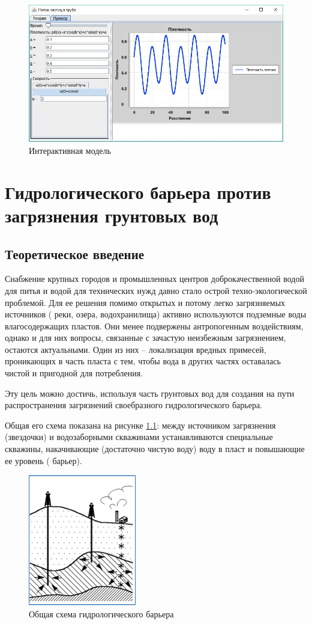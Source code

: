 		\begin{figure}[th]
			\centering
			\includegraphics[width=0.7\linewidth]{images/tube_example}
			\caption{Интерактивная модель}
			\label{fig:tubeexample}
		\end{figure}
	

\chapter{Гидрологического барьера против загрязнения грунтовых вод}

	\section{Теоретическое введение}
		Снабжение крупных городов и промышленных центров доброкачественной водой для питья и водой для технических нужд давно стало острой техно-экологической проблемой. 
		Для ее решения помимо открытых и потому легко загрязняемых источников ( реки, озера, водохранилища) активно используются подземные воды влагосодержащих пластов. 
		Они менее подвержены антропогенным воздействиям, 	     однако и для них вопросы, связанные с зачастую неизбежным загрязнением, остаются актуальными. 
		Один из них – локализация вредных примесей, проникающих 	   в часть пласта с тем, чтобы вода в других частях оставалась чистой и пригодной для потребления.
		
		Эту цель можно достичь, используя часть грунтовых вод для создания на пути распространения загрязнений своебразного гидрологического барьера.
		
		Общая его схема показана  на рисунке \ref{fig:scheme}: между источником загрязнения (звездочки)        и водозаборными скважинами устанавливаются специальные скважины, накачивающие (достаточно чистую воду) воду в пласт и повышающие ее уровень ( барьер).
		\begin{figure}[th]
			\centering
			\includegraphics[width=0.4\linewidth]{images/scheme}
			\caption{Общая схема гидрологического барьера}
			\label{fig:scheme}
		\end{figure}
		
